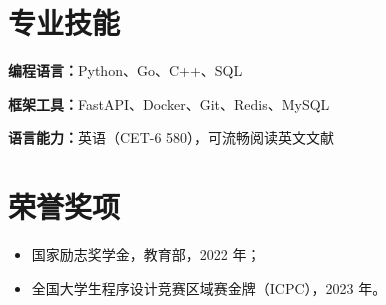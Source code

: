 \documentclass[
  UTF8,
  fontset=fandol,        %
  zihao=-4,
  a4paper,
]{ctexart}
\newcommand{\skill}[2]{\textbf{#1：}#2\par}
\begin{document}
\section{专业技能}
\skill{编程语言}{Python、Go、C++、SQL}
\skill{框架工具}{FastAPI、Docker、Git、Redis、MySQL}
\skill{语言能力}{英语（CET-6 580），可流畅阅读英文文献}

\section{荣誉奖项}
\begin{itemize}
  \item 国家励志奖学金，教育部，2022 年；
  \item 全国大学生程序设计竞赛区域赛金牌（ICPC），2023 年。
\end{itemize}
\end{document}
